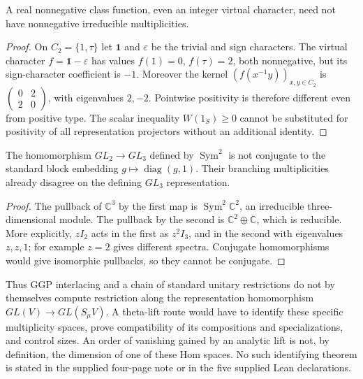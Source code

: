 \begin{proposition}
\label{prop:scalar}
A real nonnegative class function, even an integer virtual character,
need not have nonnegative irreducible multiplicities.
\end{proposition}
\begin{proof}
On $C_2=\{1,\tau\}$ let $\mathbf1$ and $\varepsilon$ be the trivial
and sign characters. The virtual character
$f=\mathbf1-\varepsilon$ has values $f(1)=0$, $f(\tau)=2$,
both nonnegative, but its sign-character coefficient is $-1$.
Moreover the kernel $(f(x^{-1}y))_{x,y\in C_2}$ is
$\left(\begin{smallmatrix}0&2\\2&0\end{smallmatrix}\right)$,
with eigenvalues $2,-2$. Pointwise positivity is therefore different
even from positive type. The scalar inequality $W(1_S)\ge0$ cannot
be substituted for positivity of all representation projectors without
an additional identity.
\end{proof}

\begin{proposition}
\label{prop:interlacing}
The homomorphism $GL_2\to GL_3$ defined by $\operatorname{Sym}^2$
is not conjugate to the standard block embedding
$g\mapsto\operatorname{diag}(g,1)$. Their branching multiplicities
already disagree on the defining $GL_3$ representation.
\end{proposition}
\begin{proof}
The pullback of $\mathbb C^3$ by the first map is
$\operatorname{Sym}^2\mathbb C^2$, an irreducible three-dimensional
module. The pullback by the second is $\mathbb C^2\oplus\mathbb C$,
which is reducible. More explicitly, $zI_2$ acts in the first as $z^2I_3$,
and in the second with eigenvalues $z,z,1$; for example $z=2$ gives
different spectra. Conjugate homomorphisms would give isomorphic pullbacks,
so they cannot be conjugate.
\end{proof}

Thus GGP interlacing and a chain of standard unitary restrictions do not
by themselves compute restriction along the representation homomorphism
$GL(V)\to GL(S_\mu V)$. A theta-lift route would have to identify these
specific multiplicity spaces, prove compatibility of its compositions
and specializations, and control sizes. An order of vanishing gained
by an analytic lift is not, by definition, the dimension of one of
these Hom spaces. No such identifying theorem is stated in the supplied
four-page note or in the five supplied Lean declarations.

